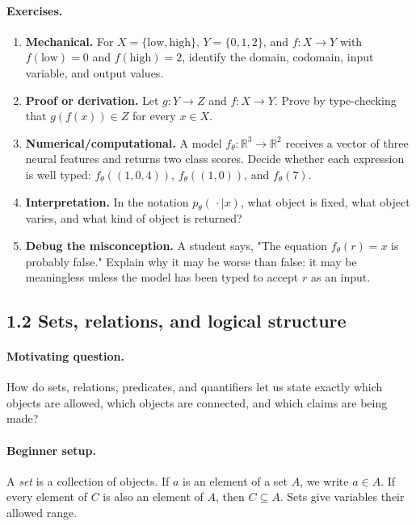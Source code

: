 \paragraph{Exercises.}
\begin{enumerate}[label=\textbf{1.1.\arabic*.}, leftmargin=*]
\item \textbf{Mechanical.} For \(X=\{\text{low},\text{high}\}\), \(Y=\{0,1,2\}\), and \(f:X\to Y\) with \(f(\text{low})=0\) and \(f(\text{high})=2\), identify the domain, codomain, input variable, and output values.
\item \textbf{Proof or derivation.} Let \(g:Y\to Z\) and \(f:X\to Y\). Prove by type-checking that \(g(f(x))\in Z\) for every \(x\in X\).
\item \textbf{Numerical/computational.} A model \(f_\theta:\mathbb{R}^3\to\mathbb{R}^2\) receives a vector of three neural features and returns two class scores. Decide whether each expression is well typed: \(f_\theta((1,0,4))\), \(f_\theta((1,0))\), and \(f_\theta(7)\).
\item \textbf{Interpretation.} In the notation \(p_\theta(\,\cdot\mid x)\), what object is fixed, what object varies, and what kind of object is returned?
\item \textbf{Debug the misconception.} A student says, "The equation \(f_\theta(r)=x\) is probably false." Explain why it may be worse than false: it may be meaningless unless the model has been typed to accept \(r\) as an input.
\end{enumerate}

\subsection{1.2 Sets, relations, and logical structure}

\paragraph{Motivating question.}
How do sets, relations, predicates, and quantifiers let us state exactly which objects are allowed, which objects are connected, and which claims are being made?

\paragraph{Beginner setup.}
A \emph{set} is a collection of objects. If \(a\) is an element of a set \(A\), we write \(a\in A\). If every element of \(C\) is also an element of \(A\), then \(C\subseteq A\). Sets give variables their allowed range.

